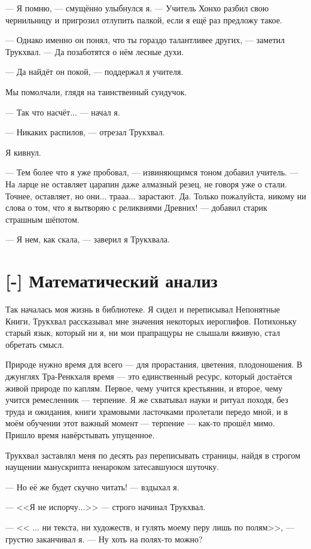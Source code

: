 --- Я помню, --- смущённо улыбнулся я.
--- Учитель Хонхо разбил свою чернильницу и пригрозил отлупить палкой, если я ещё раз предложу такое.

--- Однако именно он понял, что ты гораздо талантливее других, --- заметил Трукхвал.
--- Да позаботятся о нём лесные духи.

--- Да найдёт он покой, --- поддержал я учителя.

Мы помолчали, глядя на таинственный сундучок.

--- Так что насчёт... --- начал я.

--- Никаких распилов, --- отрезал Трукхвал.

Я кивнул.

--- Тем более что я уже пробовал, --- извиняющимся тоном добавил учитель.
--- На ларце не оставляет царапин даже алмазный резец, не говоря уже о стали.
Точнее, оставляет, но они... трааа... зарастают.
Да.
Только пожалуйста, никому ни слова о том, что я вытворяю с реликвиями Древних! --- добавил старик страшным шёпотом.

--- Я нем, как скала, --- заверил я Трукхвала.

\section{[-] Математический анализ}

Так началась моя жизнь в библиотеке.
Я сидел и переписывал Непонятные Книги, Трукхвал рассказывал мне значения некоторых иероглифов.
Потихоньку старый язык, который ни я, ни мои прапращуры не слышали вживую, стал обретать смысл.

Природе нужно время для всего --- для прорастания, цветения, плодоношения.
В джунглях Тра-Ренкхаля время --- это единственный ресурс, который достаётся живой природе по каплям.
Первое, чему учится крестьянин, и второе, чему учится ремесленник --- терпение.
Я же схватывал науки и ритуал походя, без труда и ожидания, книги храмовыми ласточками пролетали передо мной, и в моём обучении этот важный момент --- терпение --- как-то прошёл мимо.
Пришло время навёрстывать упущенное.

Трукхвал заставлял меня по десять раз переписывать страницы, найдя в строгом наущении манускрипта ненароком затесавшуюся шуточку.

--- Но её же будет скучно читать! --- вздыхал я.

--- <<Я не испорчу...>> --- строго начинал Трукхвал.

--- << ... ни текста, ни художеств, и гулять моему перу лишь по полям>>, --- грустно заканчивал я.
--- Ну хоть на полях-то можно?

